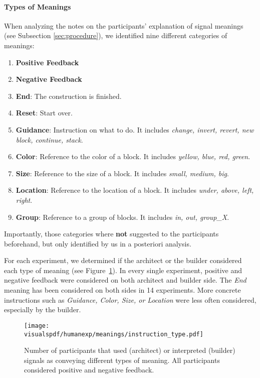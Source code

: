 \paragraph{Types of Meanings} 

When analyzing the notes on the participants' explanation of signal meanings (see Subsection \ref{sec:procedure}), we identified nine different categories of meanings:

\begin{enumerate}
    \item \textbf{Positive Feedback}
    \item \textbf{Negative Feedback}
    \item \textbf{End}: The construction is finished.
    \item \textbf{Reset}: Start over.
    \item \textbf{Guidance}: Instruction on what to do. It includes \emph{change, invert, revert, new block, continue, stack}. 
    \item \textbf{Color}: Reference to the color of a block. It includes \emph{yellow, blue, red, green}.
    \item \textbf{Size}: Reference to the size of a block. It includes \emph{small, medium, big}.
    \item \textbf{Location}: Reference to the location of a block. It includes \emph{under, above, left, right}.
    \item \textbf{Group}: Reference to a group of blocks. It includes \emph{in, out, group\_X}.
\end{enumerate}

Importantly, those categories where \textbf{not} suggested to the participants beforehand, but only identified by us in a posteriori analysis.

For each experiment, we determined if the architect or the builder considered each type of meaning (see Figure~\ref{fig:types_of_feedback}). In every single experiment, positive and negative feedback were considered on both architect and builder side. The \emph{End} meaning has been considered on both sides in 14 experiments. More concrete instructions such as \emph{Guidance, Color, Size, or Location} were less often considered, especially by the builder.

\begin{figure}[!htbp]
  \begin{center}
      \texttt{[image: \\visualspdf/humanexp/meanings/instruction\_type.pdf]}
      \caption{Number of participants that used (architect) or interpreted (builder) signals as conveying different types of meaning. All participants considered positive and negative feedback.}
    \label{fig:types_of_feedback}
  \end{center}
\end{figure}

